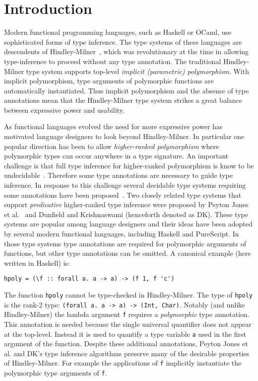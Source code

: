 \section{Introduction}

Modern functional programming languages, such as Haskell or OCaml,
use sophisticated forms of type inference. The type systems of these languages are
descendents of Hindley-Milner~\cite{}, which was revolutionary at the
time in allowing type-inference to proceed without any type
annotation. The traditional Hindley-Milner type system supports
top-level \emph{implicit (parametric) polymorphism}. With implicit
polymorphism, type arguments of polymorphic functions are
automatically instantiated. Thus implicit polymorphism and the absense of
type annotations mean that the Hindley-Milner type system 
strikes a great balance between expressive power and usability. 

As functional languages evolved the need for more expressive
power has motivated language designers to look beyond Hindley-Milner.
In particular one popular direction has been to allow 
\emph{higher-ranked polymorphism} where polymorphic types can
occur anywhere in a type signature.  
An important challenge is that full type inference for higher-ranked
polymorphism is know to be undecidable~\cite{}. Therefore some type
annotations are necessary to guide type inference. In response to this 
challenge several decidable type systems requiring some annotations 
have been proposed~\cite{}. Two closely related type systems that 
support \emph{predicative} higher-ranked type inference were proposed 
by Peyton Jones et al.~\cite{} and Dunfield and
Krishnaswami (henceforth denoted as DK). 
These type systems are
popular among language designers and their ideas have been adopted by
several modern functional languages, including Haskell and PureScript.
In those type systems
type annotations are required for polymorphic arguments of functions,
but other type annotations can be omitted. A canonical example (here written in Haskell) is:
\begin{verbatim}
hpoly = (\f :: forall a. a -> a) -> (f 1, f 'c')
\end{verbatim}
The function \verb|hpoly| cannot be
type-checked in Hindley-Milner.  The type of \verb|hpoly| is the rank-2 type:
\verb|(forall a. a -> a) -> (Int, Char)|. Notably (and unlike
Hindley-Milner) the lambda argument \verb|f| requires a
\emph{polymorphic} type annotation.
This annotation is needed because the single universal quantifier
does not appear at the top-level. Instead it is used to quantify a
type variable \verb|a| used in the first argument of the
function. 
Despite these additional annotations, Peyton Jones et al. and DK's
type inference algorithms preserve many of the desirable properties 
of Hindley-Milner. For example the applications of \verb|f| implicitly 
instantiate the polymorphic type arguments of \verb|f|.

